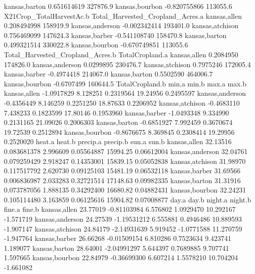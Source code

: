 \documentclass{report}
\begin{document}
\begin{Schunk}
\begin{Soutput}
kansas,barton                0.651614619                 327876.9
kansas,bourbon              -0.820755866                 113055.6
                X21Crop_TotalHarvestAc.b Total_Harvested_Cropland_Acres.a
kansas,allen                 0.208494998                         158919.9
kansas,anderson             -0.002342414                         193401.0
kansas,atchison              0.756469099                         147624.3
kansas,barber               -0.541108740                         158470.8
kansas,barton                0.499321514                         330022.8
kansas,bourbon              -0.670749851                         113055.6
                Total_Harvested_Cropland_Acres.b TotalCropland.a
kansas,allen                           0.2084950        174826.0
kansas,anderson                        0.0299895        230476.7
kansas,atchison                        0.7975246        172005.4
kansas,barber                         -0.4974418        214067.0
kansas,barton                          0.5502590        464006.7
kansas,bourbon                        -0.6707499        160644.5
                TotalCropland.b    min.a     min.b    max.a     max.b
kansas,allen         -1.0917829 8.128251 0.2319564 19.24956 0.2495597
kansas,anderson      -0.4356449 8.146259 0.2251250 18.87633 0.2206952
kansas,atchison      -0.4683110 7.438233 0.1823599 17.80146 0.1953960
kansas,barber        -1.0493348 9.334990 0.2131165 21.09026 0.2006303
kansas,barton        -0.6851927 7.992459 0.3670674 19.72539 0.2512894
kansas,bourbon       -0.8676675 8.369845 0.2308414 19.29956 0.2520020
                  heat.a      heat.b precip.a   precip.b    sun.a      sun.b
kansas,allen    32.13516 0.083681378 2.996609 0.05564887 15994.25 0.06612004
kansas,anderson 32.04761 0.079259429 2.918247 0.14353001 15839.15 0.05052838
kansas,atchison 31.98970 0.117517792 2.620730 0.09125103 15481.19 0.06532118
kansas,barber   31.69566 0.006836987 2.033283 0.32721514 17148.63 0.09982335
kansas,barton   31.31916 0.073787056 1.888135 0.34292400 16680.82 0.04882431
kansas,bourbon  32.24231 0.105114480 3.163859 0.06125616 15904.82 0.07008877
                   day.a       day.b  night.a    night.b    fine.a    fine.b
kansas,allen    23.77019 -0.81103984 6.576802  1.0929470 10.292167 -1.571719
kansas,anderson 24.27539 -1.19531212 6.555881  0.4946486 10.889593 -1.907147
kansas,atchison 24.84179 -2.14931639 5.919452 -1.0771588 11.270759 -1.947764
kansas,barber   26.66268 -0.01509154 6.810286  0.7523634  9.423741  1.189077
kansas,barton   28.64001 -2.04991297 5.644397  0.7689885  9.707741  1.597665
kansas,bourbon  22.84979 -0.36699300 6.607214  1.5578210 10.704204 -1.661082

\end{Soutput}
\end{Schunk}
\end{document}
